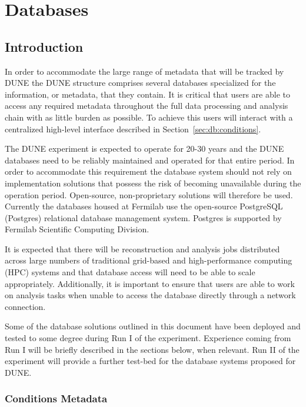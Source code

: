 \documentclass[../main-v1.tex]{subfiles}
\begin{document}
\chapter{Databases}
\label{ch:db}

\section{Introduction}
\label{sec:db:intro} 

In order to accommodate the large range of metadata that will be tracked by DUNE the DUNE  structure comprises several databases specialized for the information, or metadata, that they contain. It is critical that users are able to access any required metadata throughout the full data processing and analysis chain with as little burden as possible. To achieve this users will interact with a centralized high-level interface   described in Section~\ref{sec:db:conditions}.

The DUNE experiment is expected to operate for 20-30 years and the DUNE databases need to be reliably maintained and operated for that entire period. In order to accommodate this requirement the database system should not rely on implementation solutions that possess the risk of becoming unavailable during the operation period. Open-source, non-proprietary solutions will therefore be used. Currently the databases housed at Fermilab use the open-source PostgreSQL (Postgres) relational database management system. Postgres is supported by Fermilab Scientific Computing Division.       

It is expected that there will be reconstruction and analysis jobs distributed across large numbers of traditional grid-based and high-performance computing (HPC) systems and that database access will need to be able to scale appropriately. Additionally, it is important to ensure that users are able to work on analysis tasks when unable to access the database directly through a network connection. 

Some of the database solutions outlined in this document have been deployed and tested to some degree during Run I of the  experiment. Experience coming from  Run I will be briefly described in the sections below, when relevant. Run II of the  experiment will provide a further test-bed for the database systems proposed for DUNE.  

\subsection{Conditions Metadata}
\end{document}
